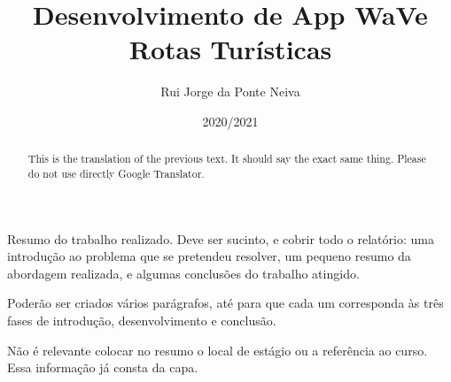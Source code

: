 \documentclass[a4paper,12pt,twoside]{book}
\title{Desenvolvimento de App WaVe Rotas Turísticas}
\author{Rui Jorge da Ponte Neiva}
\date{2020/2021}
\begin{document}
\frontmatter
\maketitle  %


\begin{resumo}
 
Resumo do trabalho realizado. Deve ser sucinto, e cobrir todo o relatório: uma introdução ao problema que se pretendeu resolver, um pequeno resumo da abordagem realizada, e algumas conclusões do trabalho atingido.

Poderão ser criados vários parágrafos, até para que cada um corresponda às três fases de introdução, desenvolvimento e conclusão.

Não é relevante colocar no resumo o local de estágio ou a referência ao curso. Essa informação já consta da capa.
\end{resumo}

\begin{abstract}
This is the translation of the previous text. It should say the exact same thing. Please do not use directly Google Translator.
\end{abstract}

\begin{agradecimentos}
\end{agradecimentos}


\tableofcontents

\listoffigures

\listoftables

\lstlistoflistings


\printglossary[type=\acronymtype,title={Siglas \& Acrónimos}]


\printglossary


\printglossary


\mainmatter








\end{document}
